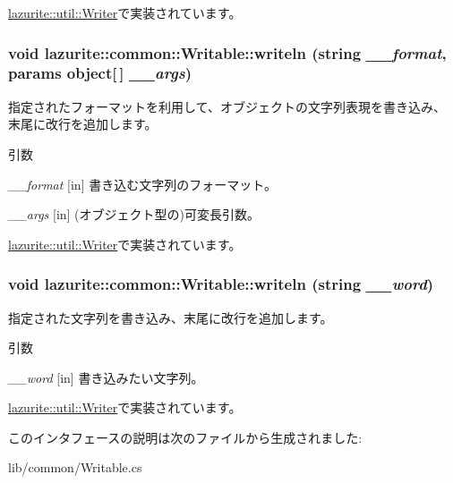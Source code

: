 \hyperlink{classlazurite_1_1util_1_1_writer_af7b90159ade4db522568ba46b3c0a00a}{lazurite::util::Writer}で実装されています。\hypertarget{interfacelazurite_1_1common_1_1_writable_a44ea83effb9ad385e07938443a2685bb}{
\subsubsection[{writeln}]{\setlength{\rightskip}{0pt plus 5cm}void lazurite::common::Writable::writeln (string {\em \_\-\_\-format}, \/  params object\mbox{[}$\,$\mbox{]} {\em \_\-\_\-args})}}
\label{interfacelazurite_1_1common_1_1_writable_a44ea83effb9ad385e07938443a2685bb}
指定されたフォーマットを利用して、オブジェクトの文字列表現を書き込み、 末尾に改行を追加します。 
\begin{DoxyParams}{引数}
\item[{\em \_\-\_\-format}]\mbox{[}in\mbox{]} 書き込む文字列のフォーマット。 \item[{\em \_\-\_\-args}]\mbox{[}in\mbox{]} (オブジェクト型の)可変長引数。 \end{DoxyParams}


\hyperlink{classlazurite_1_1util_1_1_writer_a94ba55d8211171403215e84c2da2b162}{lazurite::util::Writer}で実装されています。\hypertarget{interfacelazurite_1_1common_1_1_writable_a8414621bb09a08186a73c2b9d0f60f3e}{
\subsubsection[{writeln}]{\setlength{\rightskip}{0pt plus 5cm}void lazurite::common::Writable::writeln (string {\em \_\-\_\-word})}}
\label{interfacelazurite_1_1common_1_1_writable_a8414621bb09a08186a73c2b9d0f60f3e}
指定された文字列を書き込み、末尾に改行を追加します。 
\begin{DoxyParams}{引数}
\item[{\em \_\-\_\-word}]\mbox{[}in\mbox{]} 書き込みたい文字列。 \end{DoxyParams}


\hyperlink{classlazurite_1_1util_1_1_writer_a38610a24a9bda46a3ba1e01617a4edf5}{lazurite::util::Writer}で実装されています。

このインタフェースの説明は次のファイルから生成されました:\begin{DoxyCompactItemize}
\item 
lib/common/Writable.cs\end{DoxyCompactItemize}
